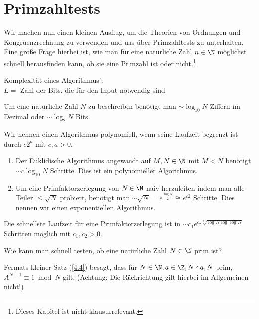 \chapter{Primzahltests}

Wir machen nun einen kleinen Ausflug, um die Theorien von Ordnungen und Kongruenzrechnung zu verwenden und uns über Primzahltests zu unterhalten. Eine große Frage hierbei ist, wie man für eine natürliche Zahl $n \in \N$ möglichst schnell herausfinden kann, ob sie eine Primzahl ist oder nicht.\footnote{Dieses Kapitel ist nicht klausurrelevant.}

Komplexität eines Algorithmus':\\
$L = $ Zahl der Bits, die für den Input notwendig sind

\begin{exmp*}
	Um eine natürliche Zahl $N$ zu beschreiben benötigt man $\sim\log_{10}N$ Ziffern im Dezimal oder $\sim\log_2N$ Bits.
\end{exmp*}

Wir nennen einen Algorithmus polynomiell, wenn seine Laufzeit begrenzt ist durch $c2^a$ mit $c,a > 0$.

\begin{exmp*}
	\begin{enumerate}[label={\roman*})]
		\item Der Euklidische Algorithmus angewandt auf $M,N \in \N$ mit $M<N$ benötigt $\sim c\log_{10}N$ Schritte. Dies ist ein polynomieller Algorithmus.
		\item Um eine Primfaktorzerlegung von $N \in \N$ naiv herzuleiten indem man alle Teiler $\leq \sqrt{N}$ probiert, benötigt man $\sim \sqrt{N} = e^{\frac{\log N}{2}} \cong e^{c2}$ Schritte. Dies nennen wir einen exponentiellen Algorithmus.
 	\end{enumerate}
\end{exmp*}

Die schnellste Laufzeit für eine Primfaktorzerlegung ist in $\sim c_1 e^{c_2\sqrt[3]{\log N \log\log N}}$ Schritten möglich mit $c_1,c_2 > 0$.

\begin{frage*}
	Wie kann man schnell testen, ob eine natürliche Zahl $N \in \N$ prim ist?
\end{frage*}

Fermats kleiner Satz (\ref{4.4}) besagt, dass für $N \in \N, a \in \Z, N \nmid a, N$ prim, $A^{N-1} \equiv 1 \bmod N$ gilt. (Achtung: Die Rückrichtung gilt hierbei im Allgemeinen nicht!) 

